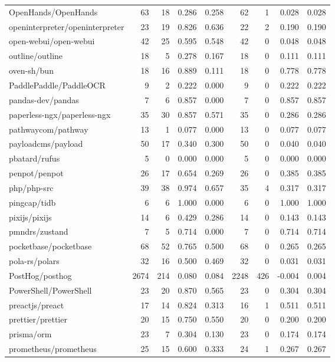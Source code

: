 \begin{tabular}{lrrrrrrrr}
OpenHands/OpenHands & 63 & 18 & 0.286 & 0.258 & 62 & 1 & 0.028 & 0.028 \\
openinterpreter/openinterpreter & 23 & 19 & 0.826 & 0.636 & 22 & 2 & 0.190 & 0.190 \\
open-webui/open-webui & 42 & 25 & 0.595 & 0.548 & 42 & 0 & 0.048 & 0.048 \\
outline/outline & 18 & 5 & 0.278 & 0.167 & 18 & 0 & 0.111 & 0.111 \\
oven-sh/bun & 18 & 16 & 0.889 & 0.111 & 18 & 0 & 0.778 & 0.778 \\
PaddlePaddle/PaddleOCR & 9 & 2 & 0.222 & 0.000 & 9 & 0 & 0.222 & 0.222 \\
pandas-dev/pandas & 7 & 6 & 0.857 & 0.000 & 7 & 0 & 0.857 & 0.857 \\
paperless-ngx/paperless-ngx & 35 & 30 & 0.857 & 0.571 & 35 & 0 & 0.286 & 0.286 \\
pathwaycom/pathway & 13 & 1 & 0.077 & 0.000 & 13 & 0 & 0.077 & 0.077 \\
payloadcms/payload & 50 & 17 & 0.340 & 0.300 & 50 & 0 & 0.040 & 0.040 \\
pbatard/rufus & 5 & 0 & 0.000 & 0.000 & 5 & 0 & 0.000 & 0.000 \\
penpot/penpot & 26 & 17 & 0.654 & 0.269 & 26 & 0 & 0.385 & 0.385 \\
php/php-src & 39 & 38 & 0.974 & 0.657 & 35 & 4 & 0.317 & 0.317 \\
pingcap/tidb & 6 & 6 & 1.000 & 0.000 & 6 & 0 & 1.000 & 1.000 \\
pixijs/pixijs & 14 & 6 & 0.429 & 0.286 & 14 & 0 & 0.143 & 0.143 \\
pmndrs/zustand & 7 & 5 & 0.714 & 0.000 & 7 & 0 & 0.714 & 0.714 \\
pocketbase/pocketbase & 68 & 52 & 0.765 & 0.500 & 68 & 0 & 0.265 & 0.265 \\
pola-rs/polars & 32 & 16 & 0.500 & 0.469 & 32 & 0 & 0.031 & 0.031 \\
PostHog/posthog & 2674 & 214 & 0.080 & 0.084 & 2248 & 426 & -0.004 & 0.004 \\
PowerShell/PowerShell & 23 & 20 & 0.870 & 0.565 & 23 & 0 & 0.304 & 0.304 \\
preactjs/preact & 17 & 14 & 0.824 & 0.313 & 16 & 1 & 0.511 & 0.511 \\
prettier/prettier & 20 & 15 & 0.750 & 0.550 & 20 & 0 & 0.200 & 0.200 \\
prisma/orm & 23 & 7 & 0.304 & 0.130 & 23 & 0 & 0.174 & 0.174 \\
prometheus/prometheus & 25 & 15 & 0.600 & 0.333 & 24 & 1 & 0.267 & 0.267 \\

\end{tabular}
